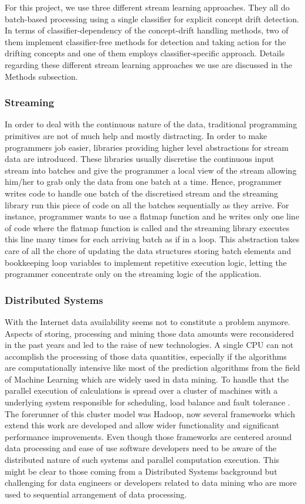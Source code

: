 \documentclass{article} %
\begin{document}
For this project, we use three different stream learning approaches. They all do batch-based processing using a single classifier for explicit concept drift detection. In terms of classifier-dependency of the concept-drift handling methods, two of them implement classifier-free methods for detection and taking action for the drifting concepts and one of them employs classifier-specific approach. Details regarding these different stream learning approaches we use are discussed in the Methods subsection.


\subsubsection{Streaming}
In order to deal with the continuous nature of the data, traditional programming primitives are not of much help and mostly distracting. In order to make programmers job easier, libraries providing higher level abstractions for stream data are introduced. These libraries usually discretise the continuous input stream into batches and give the programmer a local view of the stream allowing him/her to grab only the data from one batch at a time. Hence, programmer writes code to handle one batch of the discretised stream and the streaming library run this piece of code on all the batches sequentially as they arrive. For instance, programmer wants to use a flatmap function and he writes only one line of code where the flatmap function is called and the streaming library executes this line many times for each arriving batch as if in a loop. This abstraction takes care of all the chore of updating the data structures storing batch elements and bookkeeping loop variables to implement repetitive execution logic, letting the programmer concentrate only on the streaming logic of the application. 

\subsubsection{Distributed Systems}
With the Internet data availability seems not to constitute a problem anymore. Aspects of storing, processing and mining those data amounts were reconsidered in the past years and led to the raise of new technologies. A single CPU can not accomplish the processing of those data quantities, especially if the algorithms are computationally intensive like most of the prediction algorithms from the field of Machine Learning which are widely used in data mining. To handle that  the parallel execution of calculations is spread over a cluster of machines with a underlying system responsible for scheduling, load balance and fault tolerance \cite[p. 10]{zaharia2010} . The forerunner of this cluster model was Hadoop, now several frameworks which extend this work are developed and allow wider functionality and significant performance improvements. Even though those frameworks are centered around data processing and ease of use software developers need to be aware of the distributed nature of such systems and parallel computation execution. This might be clear to those coming from a Distributed Systems background but challenging for data engineers or developers related to data mining who are more used to sequential arrangement of data processing. 
\end{document}
